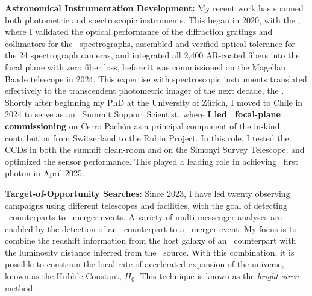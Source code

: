 \textbf{Astronomical Instrumentation Development:}
My recent work has spanned both photometric and spectroscopic instruments.
This began in 2020, with the \LLAMAS, where I validated the optical performance of the diffraction gratings and collimators for the \LLAMAS\ spectrographs, assembled and verified optical tolerance for the 24 spectrograph cameras, and integrated all 2,400 AR-coated fibers into the focal plane with zero fiber loss, before it was commissioned on the Magellan Baade telescope in 2024. %
This expertise with spectroscopic instruments translated effectively to the transcendent photometric imager of the next decade, the \LSSTCam. Shortly after beginning my PhD at the University of Zürich, I moved to Chile in 2024 to serve as an \LSSTCam\ Summit Support Scientist, where \textbf{I led \LSSTCam\ focal-plane commissioning} on Cerro Pach\'on as a principal component of the in-kind contribution from Switzerland to the Rubin Project. In this role, I tested the CCDs in both the summit clean-room and on the Simonyi Survey Telescope, and optimized the sensor performance. This played a leading role in achieving \LSSTCam\ first photon in April 2025.

\textbf{Target-of-Opportunity Searches:}
Since 2023, I have led twenty observing campaigns using different telescopes and facilities, with the goal of detecting \EM\ counterparts to \GW\ merger events. 
A variety of multi-messenger analyses are enabled by the detection of an \EM\ counterpart to a \GW\ merger event. My focus is to combine the redshift information from the host galaxy of an \EM\ counterpart with the luminosity distance inferred from the \GW\ source. With this combination, it is possible to constrain the local rate of accelerated expansion of the universe, known as the Hubble Constant, $H_0$. This technique is known as the \textit{bright siren} method.


